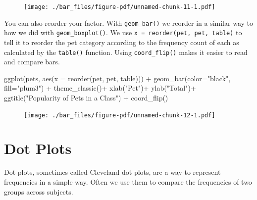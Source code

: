 \documentclass[
  letterpaper,
  DIV=11,
  numbers=noendperiod]{scrreprt}
\newenvironment{Shaded}{\begin{snugshade}}{\end{snugshade}}
\newcommand{\AttributeTok}[1]{\textcolor[rgb]{0.40,0.45,0.13}{#1}}
\newcommand{\FunctionTok}[1]{\textcolor[rgb]{0.28,0.35,0.67}{#1}}
\newcommand{\NormalTok}[1]{\textcolor[rgb]{0.00,0.23,0.31}{#1}}
\newcommand{\SpecialCharTok}[1]{\textcolor[rgb]{0.37,0.37,0.37}{#1}}
\newcommand{\StringTok}[1]{\textcolor[rgb]{0.13,0.47,0.30}{#1}}
\begin{document}
\begin{figure}[H]

{\centering \texttt{[image: ./bar\_files/figure-pdf/unnamed-chunk-11-1.pdf]}

}

\end{figure}

You can also reorder your factor. With \texttt{geom\_bar()} we reorder
in a similar way to how we did with \texttt{geom\_boxplot()}. We use
\texttt{x\ =\ reorder(pet,\ pet,\ table)} to tell it to reorder the pet
category according to the frequency count of each as calculated by the
\texttt{table()} function. Using \texttt{coord\_flip()} makes it easier
to read and compare bars.

\begin{Shaded}
\begin{Highlighting}[]
\FunctionTok{ggplot}\NormalTok{(pets, }\FunctionTok{aes}\NormalTok{(}\AttributeTok{x =} \FunctionTok{reorder}\NormalTok{(pet, pet, table))) }\SpecialCharTok{+} 
  \FunctionTok{geom\_bar}\NormalTok{(}\AttributeTok{color=}\StringTok{"black"}\NormalTok{, }\AttributeTok{fill=}\StringTok{"plum3"}\NormalTok{) }\SpecialCharTok{+}
  \FunctionTok{theme\_classic}\NormalTok{()}\SpecialCharTok{+}
  \FunctionTok{xlab}\NormalTok{(}\StringTok{"Pet"}\NormalTok{)}\SpecialCharTok{+}
  \FunctionTok{ylab}\NormalTok{(}\StringTok{"Total"}\NormalTok{)}\SpecialCharTok{+}
  \FunctionTok{ggtitle}\NormalTok{(}\StringTok{"Popularity of Pets in a Class"}\NormalTok{) }\SpecialCharTok{+}
  \FunctionTok{coord\_flip}\NormalTok{()}
\end{Highlighting}
\end{Shaded}

\begin{figure}[H]

{\centering \texttt{[image: ./bar\_files/figure-pdf/unnamed-chunk-12-1.pdf]}

}

\end{figure}


\hypertarget{dot-plots}{%
\chapter{Dot Plots}\label{dot-plots}}

Dot plots, sometimes called Cleveland dot plots, are a way to represent
frequencies in a simple way. Often we use them to compare the
frequencies of two groups across subjects.
\end{document}
